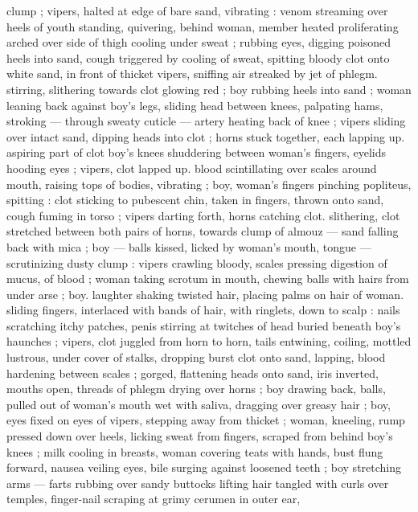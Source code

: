 clump ; vipers, halted at edge of bare sand, vibrating : venom 
streaming over heels of youth standing, quivering, behind woman, 
member heated proliferating arched over side of thigh cooling under 
sweat ; rubbing eyes, digging poisoned heels into sand, cough 
triggered by cooling of sweat, spitting bloody clot onto white sand, 
in front of thicket {\col} vipers, sniffing air streaked by jet of phlegm. 
stirring, slithering towards clot glowing red ; boy rubbing heels into 
sand ; woman leaning back against boy's legs, sliding head between 
knees, palpating hams, stroking --- through sweaty cuticle --- 
 artery heating back of knee ; vipers sliding over intact 
sand, dipping heads into clot ; horns stuck together, each lapping up. 
aspiring part of clot {\col} boy's knees shuddering between woman's 
fingers, eyelids hooding eyes ; vipers, clot lapped up. blood 
scintillating over scales around mouth, raising tops of bodies, 
vibrating ; boy, woman's fingers pinching popliteus, spitting : clot 
sticking to pubescent chin, taken in fingers, thrown onto sand, cough 
fuming in torso ; vipers darting forth, horns catching clot. slithering, 
clot stretched between both pairs of horns, towards clump of almouz 
--- sand falling back with mica ; boy --- balls kissed, licked by 
woman's mouth, tongue --- scrutinizing dusty clump : vipers crawling 
bloody, scales pressing digestion of mucus, of blood ; woman taking 
scrotum in mouth, chewing balls with hairs from under arse ; boy. 
laughter shaking twisted hair, placing palms on hair of woman. sliding 
fingers, interlaced with bands of hair, with ringlets, down to scalp : 
nails scratching itchy patches, penis stirring at twitches of head 
buried beneath boy's haunches ; vipers, clot juggled from horn to 
horn, tails entwining, coiling, mottled lustrous, under cover of stalks, 
dropping burst clot onto sand, lapping, blood hardening between 
scales ; gorged, flattening heads onto sand, iris inverted, mouths 
open, threads of phlegm drying over horns ; boy drawing back, balls, 
pulled out of woman's mouth wet with saliva, dragging over greasy 
hair ; boy, eyes fixed on eyes of vipers, stepping away from thicket ; 
woman, kneeling, rump pressed down over heels, licking sweat from 
fingers, scraped from behind boy's knees ; milk cooling in breasts, 
woman covering teats with hands, bust flung forward, nausea veiling 
eyes, bile surging against loosened teeth ; boy stretching arms --- 
farts rubbing over sandy buttocks{\comdash} lifting hair tangled with curls 
over temples, finger-nail scraping at grimy cerumen in outer ear, 
